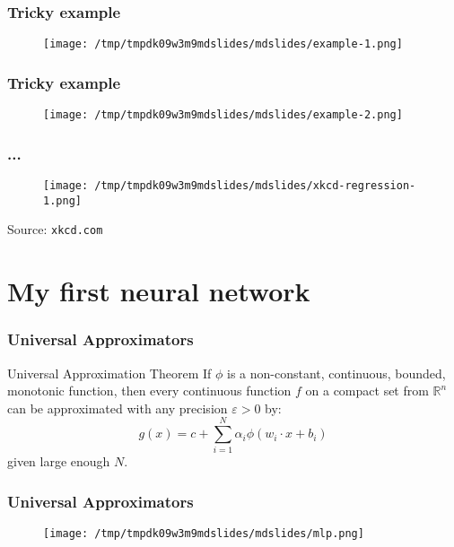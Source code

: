 \documentclass[mathserif, aspectratio=43]{beamer}
\begin{document}
\begin{frame}[fragile]
\frametitle{Tricky example}
\begin{figure}
\centering
\texttt{[image: /tmp/tmpdk09w3m9mdslides/mdslides/example-1.png]}

\end{figure}


\end{frame}


\begin{frame}[fragile]
\frametitle{Tricky example}
\begin{figure}
\centering
\texttt{[image: /tmp/tmpdk09w3m9mdslides/mdslides/example-2.png]}

\end{figure}


\end{frame}


\begin{frame}[fragile]
\frametitle{...}
\begin{figure}
\centering
\texttt{[image: /tmp/tmpdk09w3m9mdslides/mdslides/xkcd-regression-1.png]}

\end{figure}

{
  \footnotesize
  Source: \texttt{xkcd.com}
}

\end{frame}


\section{My first neural network}



\begin{frame}[fragile]
\frametitle{Universal Approximators}
\begin{block}{Universal Approximation Theorem}
  If $\phi$ is a non-constant, continuous, bounded, monotonic function, then every continuous function $f$ on a compact set from $\mathbb{R}^n$
  can be approximated with any precision $\varepsilon > 0$ by:
    $$g(x) = c + \sum^N_{i = 1} \alpha_i \phi(w_i \cdot x + b_i)$$
  given large enough $N$.
\end{block}

\end{frame}


\begin{frame}[fragile]
\frametitle{Universal Approximators}
\begin{figure}
\centering
\texttt{[image: /tmp/tmpdk09w3m9mdslides/mdslides/mlp.png]}

\end{figure}


\end{frame}
\end{document}

